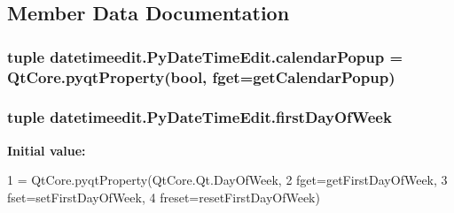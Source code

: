 \subsection{Member Data Documentation}
\hypertarget{classdatetimeedit_1_1PyDateTimeEdit_a31e1715be3ef124d1f2917ebd0f26494}{}
\subsubsection[{calendar\+Popup}]{\setlength{\rightskip}{0pt plus 5cm}tuple datetimeedit.\+Py\+Date\+Time\+Edit.\+calendar\+Popup = Qt\+Core.\+pyqt\+Property({\bf bool}, fget={\bf get\+Calendar\+Popup})\hspace{0.3cm}{\ttfamily [static]}}\label{classdatetimeedit_1_1PyDateTimeEdit_a31e1715be3ef124d1f2917ebd0f26494}
\hypertarget{classdatetimeedit_1_1PyDateTimeEdit_aa630c83872f31d97bb16f8d8a9b8adf8}{}
\subsubsection[{first\+Day\+Of\+Week}]{\setlength{\rightskip}{0pt plus 5cm}tuple datetimeedit.\+Py\+Date\+Time\+Edit.\+first\+Day\+Of\+Week\hspace{0.3cm}{\ttfamily [static]}}\label{classdatetimeedit_1_1PyDateTimeEdit_aa630c83872f31d97bb16f8d8a9b8adf8}
{\bfseries Initial value\+:}
\begin{DoxyCode}
1 = QtCore.pyqtProperty(QtCore.Qt.DayOfWeek,
2                                          fget=getFirstDayOfWeek,
3                                          fset=setFirstDayOfWeek,
4                                          freset=resetFirstDayOfWeek)
\end{DoxyCode}
\hypertarget{classdatetimeedit_1_1PyDateTimeEdit_aa592a5125494beb3f3c50d8b3ee4a054}{}
